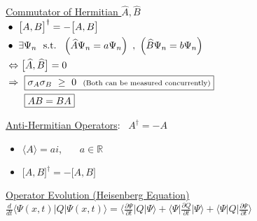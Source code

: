 \documentclass[12pt]{article}
\begin{document}
\vspace{10pt} \noindent
\begin{minipage}[t]{.53\textwidth}
    \underline{Commutator of Hermitian \(\widehat{A}, \widehat{B}\)}\\[5pt]
    \(\begin{aligned}
        & \bullet\ \big[A,B \big]^\dagger = - \big[ A,B \big] \\
        & \bullet\ \exists \Psi_n \ \ \text{s.t.} \ \ \left( \widehat{A} \Psi_n = a \Psi_n \right) \ , \ 
            \left( \widehat{B} \Psi_n = b \Psi_n \right) 
            \\
        & \Leftrightarrow \big[ \widehat{A}, \widehat{B} \big] = 0 \\
        & \Rightarrow \ \begin{aligned}[t]
                & \boxed{ \sigma_A \sigma_B \ \geq \ 0 \ \ 
                    \text{\scriptsize (Both can be measured concurrently)} } 
                    \\
                & \boxed{ AB = BA}
            \end{aligned} 
            \\
    \end{aligned}\)
\end{minipage}
\hfill
\begin{minipage}[t]{.4\textwidth}
    \underline{Anti-Hermitian Operators}: \ \( A^\dagger = - A \)
    \begin{itemize}
        \item \( \langle A \rangle = ai \), \ \ \ \( a \in \mathbb{R} \)
        \item \( \big[ A,B \big]^\dagger = - \big[ A,B \big] \)
    \end{itemize}
\end{minipage}


%
%
%
\newpage \noindent
\underline{Operator Evolution (Heisenberg Equation)}\\[10pt]
\(\displaystyle
    \frac{d}{dt} \Big\langle \Psi(x,t) \Big| Q \Big| \Psi(x,t) \Big\rangle 
        = \Big\langle \frac{\partial \Psi}{\partial t} \Big| Q \Big| \Psi \Big\rangle 
        + \Big\langle \Psi \Big| \frac{\partial Q}{\partial t} \Big| \Psi \Big\rangle 
        + \Big\langle \Psi \Big| Q \Big| \frac{\partial \Psi}{\partial t} \Big\rangle 
\)
\end{document}
